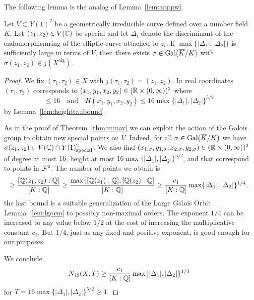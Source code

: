 The following lemma is the analog of Lemma~\ref{lem:apppw}. 
\begin{lemma}
  \label{lem:apppwao}
  Let $V\subset Y(1)^2$ be a geometrically irreducible curve defined
  over a number field $K$.
  Let $(z_1,z_2)\in V({\mathbb{C}})$ be special and let $\Delta_i$ denote the discriminant
  of the endomorphismring of the elliptic curve attached to $z_i$.
  If $\max\{|\Delta_1|,|\Delta_2|\}$ is sufficiently large in terms of
  $V$, then there exists $\sigma\in \mathrm{Gal}(\overline{K}/K)$ with
  $\sigma(z_1,z_2)\in j(X^{\mathrm{alg}})$.   
\end{lemma}
\begin{proof}%
  We fix $(\tau_1,\tau_2) \in X$ with $j(\tau_1,\tau_2)=(z_1,z_2)$.
  In real coordinates $(\tau_1,\tau_2)$ corresponds to
  $(x_1,y_1,x_2,y_2) \in ({\mathbb{R}}\times(0,\infty))^2$ where
  \begin{equation*}
    [\IQ(x_1,y_1,x_2,y_1):\IQ]\le 16
    \quad\text{and}\quad
    H(x_1,y_1,x_2,y_2) \le 16 \max\{|\Delta_1|,|\Delta_2|\}^{5/2}
  \end{equation*}
  by Lemma~\ref{lem:heighttaubound}.

  As in the proof of Theorem~\ref{thm:mmav} we can exploit the action of the
  Galois group to obtain new special points on $V$. Indeed, for all
  $\sigma\in \mathrm{Gal}(\overline{K}/K)$ we have $\sigma(z_1,z_2) \in
  V({\mathbb{C}})\cap Y(1)^2_{\mathrm{special}}$. We also find
  $(x_{1,\sigma},y_{1,\sigma},x_{2,\sigma},y_{2,\sigma})\in({\mathbb{R}}\times(0,\infty))^2$
  of degree at most $16$, height at most
  $16\max\{|\Delta_1|,|\Delta_2|\}^{5/2}$, and   
  that correspond to points in ${\mathcal F}^2$.
  The number of points we obtain is
  \begin{equation*}
    [K(z_1,z_2):K] \ge \frac{[\IQ(z_1,z_2):\IQ]}{[K:\IQ]} \ge
    \frac{\max\{[\IQ(z_1):\IQ],[\IQ(z_2):\IQ]}{[K:\IQ]}
    \ge \frac{c_1}{[K:\IQ]}  \max\{|\Delta_1|,|\Delta_2|\}^{1/4},
  \end{equation*}
  the last bound is a suitable generalization of the Large Galois
  Orbit Lemma~\ref{lem:lgocm}
  to possibly non-maximal orders. The exponent $1/4$ can be increased
  to any value below $1/2$ at the cost of increasing the
  multiplicative constant $c_1$. But $1/4$, just as any fixed and
  positive exponent, is good enough for our purposes.


  We conclude
  \begin{equation}
    \label{eq:aonlb}
    N_{16}(X,T) \ge \frac{c_1}{[K:{\mathbb{Q}}]} \max\{|\Delta_1|,|\Delta_2|\}^{1/4}
  \end{equation}
  for $T = 16 \max\{|\Delta_1|,|\Delta_2|\}^{5/2}\ge 1$. 


\end{proof}
